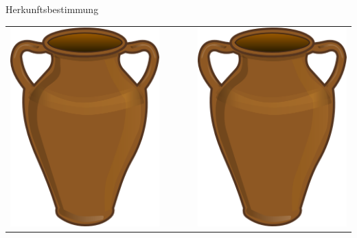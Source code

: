 \documentclass[xcolor=x11names, aspectratio=169]{beamer}
\begin{document}
\begin{frame}{Herkunftsbestimmung}
\begin{center}
\begin{tabularx}{.9\columnwidth}{rlCrl}
&&&&\\

\end{tabularx}
\end{center}
\end{frame}
\end{document}
